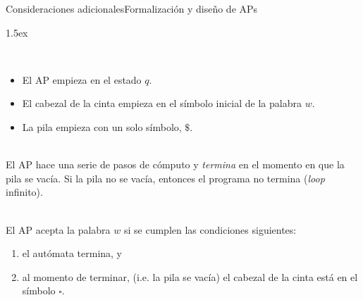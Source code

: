 \documentclass[spanish, handout]{beamer}
\begin{document}
{%
\begin{frame}{Consideraciones adicionales}{Formalización y diseño de APs}
    \begin{description}
        \itemsep1.5ex
        \item[Configuración inicial] \hfill \\ 
        \begin{itemize}
            \item El AP empieza en el estado $q$. \pause 
            \item El cabezal de la cinta empieza en el símbolo inicial de la palabra $w$. \pause 
            \item La pila empieza con un solo símbolo, $\$$. \pause 
        \end{itemize}

        \item[Cómputo y terminación] \hfill \\ 
        El AP hace una serie de pasos de cómputo y \textit{termina} en el momento en que la pila se vacía. Si la pila no se vacía, entonces el programa no termina (\textit{loop} infinito). \pause 
        \item[Aceptación] \hfill \\ 
        El AP acepta la palabra $w$ si se cumplen las condiciones siguientes:
        \begin{enumerate}
            \item el autómata termina, y \pause 
            \item al momento de terminar, (i.e. la pila se vacía) el cabezal de la cinta está en el símbolo $\square$.
        \end{enumerate}
    \end{description}
\end{frame}
}
\end{document}
